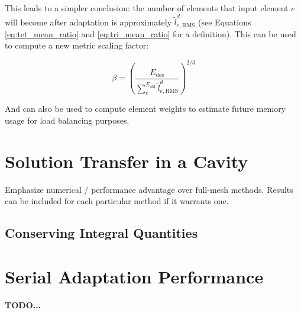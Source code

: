 This leads to a simpler conclusion: the number of elements that
input element $e$ will become after adaptation is approximately
$\tilde{l}_{e,\text{RMS}}^d$
(see Equations \ref{eq:tet_mean_ratio} and \ref{eq:tri_mean_ratio}
for a definition).
This can be used to compute a new metric scaling factor:

\begin{equation}
\beta = \left(\frac{E_{\text{des}}}
{\sum_e^{E_{\text{old}}} \tilde{l}_{e,\text{RMS}}^d}\right)^{2/3}
\end{equation}

And can also be used to compute element weights to estimate
future memory usage for load balancing purposes.

\section{Solution Transfer in a Cavity}

Emphasize numerical / performance advantage
over full-mesh methods.
Results can be included for each particular
method if it warrants one.

\subsection{Conserving Integral Quantities}

\section{Serial Adaptation Performance}

{\bf TODO... }



